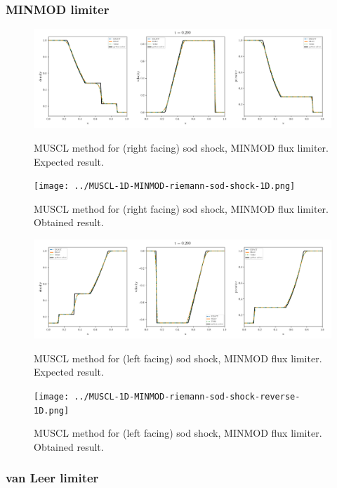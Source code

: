 \clearpage
\subsubsection{MINMOD limiter}

    \begin{figure}[htbp]
        \centering
        \includegraphics[width=.9\textwidth]{./figures/MUSCL-1D-MINMOD-riemann-sod-shock-1D.png}%
        \caption{MUSCL method for (right facing) sod shock, MINMOD flux limiter. Expected result.}
        \texttt{[image: ../MUSCL-1D-MINMOD-riemann-sod-shock-1D.png]}%
        \caption{MUSCL method for (right facing) sod shock, MINMOD flux limiter. Obtained result.}
    \end{figure}


    \begin{figure}[htbp]
        \centering
        \includegraphics[width=.9\textwidth]{./figures/MUSCL-1D-MINMOD-riemann-sod-shock-reverse-1D.png}%
        \caption{MUSCL method for (left facing) sod shock, MINMOD flux limiter. Expected result.}
        \texttt{[image: ../MUSCL-1D-MINMOD-riemann-sod-shock-reverse-1D.png]}%
        \caption{MUSCL method for (left facing) sod shock, MINMOD flux limiter. Obtained result.}
    \end{figure}









\clearpage
\subsubsection{van Leer limiter}

